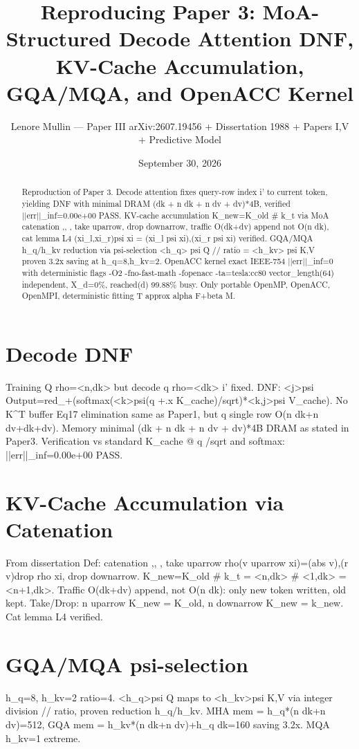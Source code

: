 \documentclass[11pt,a4paper]{article}
\title{Reproducing Paper 3: MoA-Structured Decode Attention DNF, KV-Cache Accumulation, GQA/MQA, and OpenACC Kernel}
\author{Lenore Mullin — Paper III arXiv:2607.19456 + Dissertation 1988 + Papers I,V + Predictive Model}
\date{September 30, 2026}
\begin{document}
\maketitle
\begin{abstract}
Reproduction of Paper 3. Decode attention fixes query-row index i' to current token, yielding DNF with minimal DRAM (dk + n dk + n dv + dv)*4B, verified ||err||\_inf=0.00e+00 PASS. KV-cache accumulation K\_new=K\_old \# k\_t via MoA catenation ,, , take uparrow, drop downarrow, traffic O(dk+dv) append not O(n dk), cat lemma L4 (xi\_l,xi\_r)psi xi = (xi\_l psi xi),(xi\_r psi xi) verified. GQA/MQA h\_q/h\_kv reduction via psi-selection <h\_q> psi Q // ratio = <h\_kv> psi K,V proven 3.2x saving at h\_q=8,h\_kv=2. OpenACC kernel exact IEEE-754 ||err||\_inf=0 with deterministic flags -O2 -fno-fast-math -fopenacc -ta=tesla:cc80 vector\_length(64) independent, X\_d=0\%, reached(d) 99.88\% busy. Only portable OpenMP, OpenACC, OpenMPI, deterministic fitting T approx alpha F+beta M.
\end{abstract}
\section{Decode DNF}
Training Q rho=<n,dk> but decode q rho=<dk> i' fixed. DNF: <j>psi Output=red\_+(softmax(<k>psi(q +.x K\_cache)/sqrt)*<k,j>psi V\_cache). No K^T buffer Eq17 elimination same as Paper1, but q single row O(n dk+n dv+dk+dv). Memory minimal (dk + n dk + n dv + dv)*4B DRAM as stated in Paper3. Verification vs standard K\_cache @ q /sqrt and softmax: ||err||\_inf=0.00e+00 PASS.

\section{KV-Cache Accumulation via Catenation}
From dissertation Def: catenation ,, , take uparrow rho(v uparrow xi)=(abs v),(r v)drop rho xi, drop downarrow. K\_new=K\_old \# k\_t = <n,dk> \# <1,dk> = <n+1,dk>. Traffic O(dk+dv) append, not O(n dk): only new token written, old kept. Take/Drop: n uparrow K\_new = K\_old, n downarrow K\_new = k\_new. Cat lemma L4 verified.

\section{GQA/MQA psi-selection}
h\_q=8, h\_kv=2 ratio=4. <h\_q>psi Q maps to <h\_kv>psi K,V via integer division // ratio, proven reduction h\_q/h\_kv. MHA mem = h\_q*(n dk+n dv)=512, GQA mem = h\_kv*(n dk+n dv)+h\_q dk=160 saving 3.2x. MQA h\_kv=1 extreme.
\end{document}
